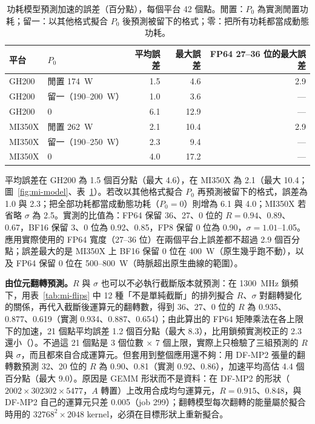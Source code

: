 \begin{table}[tbp]
\centering
\caption[功耗模型的誤差]{功耗模型預測加速的誤差（百分點），每個平台 42 個點。閒置：$P_0$ 為實測閒置功耗；留一：以其他格式擬合 $P_0$ 後預測被留下的格式；零：把所有功耗都當成動態功耗。}\label{tab:mi-modelerr}
\small
\begin{tabular}{@{}llrrr@{}}
\toprule
平台 & $P_0$ & 平均誤差 & 最大誤差 & FP64 27–36 位的最大誤差 \\
\midrule
GH200 & 閒置 174~W & 1.5 & 4.6 & 2.9 \\
GH200 & 留一（190–200~W） & 1.0 & 3.6 & — \\
GH200 & 0 & 6.1 & 12.9 & — \\
MI350X & 閒置 262~W & 2.1 & 10.4 & 2.9 \\
MI350X & 留一（190–250~W） & 2.3 & 9.4 & — \\
MI350X & 0 & 4.0 & 17.2 & — \\
\bottomrule
\end{tabular}
\end{table}

平均誤差在 GH200 為 1.5 個百分點（最大 4.6），在 MI350X 為 2.1（最大 10.4；圖~\ref{fig:mi-model}、表~\ref{tab:mi-modelerr}）。若改以其他格式擬合 $P_0$ 再預測被留下的格式，誤差為 1.0 與 2.3；把全部功耗都當成動態功耗（$P_0=0$）則增為 6.1 與 4.0；MI350X 若省略 $\sigma$ 為 2.5。實測的比值為：FP64 保留 36、27、0 位的 $R=0.94$、0.89、0.67，BF16 保留 3、0 位為 0.92、0.85，FP8 保留 0 位為 0.90，$\sigma=1.01$–1.05。應用實際使用的 FP64 寬度（27–36 位）在兩個平台上誤差都不超過 2.9 個百分點；誤差最大的是 MI350X 上 BF16 保留 0 位在 400~W（原生幾乎跑不動），以及 FP64 保留 0 位在 500–800~W（時脈超出原生曲線的範圍）。

\textbf{由位元翻轉預測。}$R$ 與 $\sigma$ 也可以不必執行截斷版本就預測：在 1300~MHz 鎖頻下，用表~\ref{tab:mi-flips} 中 12 種「不是單純截斷」的排列擬合 $R$、$\sigma$ 對翻轉變化的關係，再代入截斷後運算元的翻轉數，得到 36、27、0 位的 $R$ 為 0.935、0.877、0.619（實測 0.934、0.887、0.654）；由此算出的 FP64 矩陣乘法在各上限下的加速，21 個點平均誤差 1.2 個百分點（最大 8.3），比用鎖頻實測校正的 2.3 還小（）。不過這 21 個點是 3 個位數 × 7 個上限，實際上只檢驗了三組預測的 $R$ 與 $\sigma$，而且都來自合成運算元。但套用到整個應用還不夠：用 DF-MP2 張量的翻轉數預測 32、20 位的 $R$ 為 0.90、0.81（實測 0.92、0.86），加速平均高估 4.4 個百分點（最大 9.0）。原因是 GEMM 形狀而不是資料：在 DF-MP2 的形狀（$2002\times302302\times5477$，$A$ 轉置）上改用合成均勻運算元，$R=0.915$、0.848，與 DF-MP2 自己的運算元只差 0.005（job 299）；翻轉模型每次翻轉的能量屬於擬合時用的 $32768^2\times2048$ kernel，必須在目標形狀上重新擬合。

